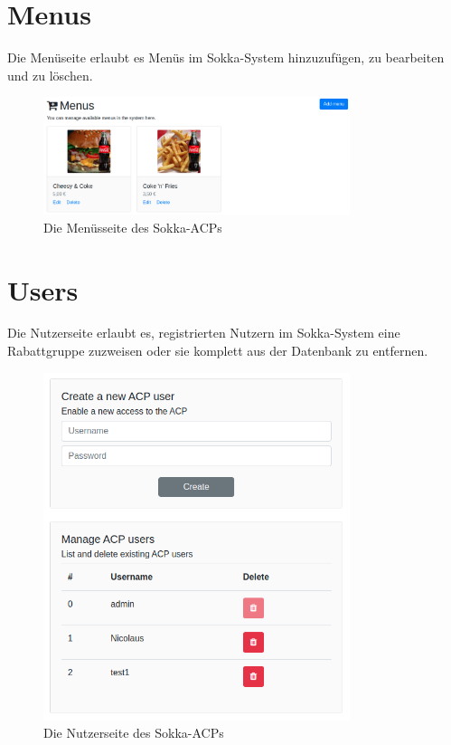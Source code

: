\section{Menus}

Die Menüseite erlaubt es Menüs im Sokka-System hinzuzufügen, zu bearbeiten und zu löschen.

\begin{figure}[ht]
    \centering
    \includegraphics[width=0.8\textwidth]{images/ACP/menus.png}
    \caption{Die Menüsseite des Sokka-ACPs}
\end{figure}

\section{Users}

Die Nutzerseite erlaubt es, registrierten Nutzern im Sokka-System eine Rabattgruppe zuzweisen oder sie komplett aus der Datenbank zu entfernen.

\begin{figure}[ht]
    \centering
    \includegraphics[width=0.8\textwidth]{images/ACP/users.png}
    \caption{Die Nutzerseite des Sokka-ACPs}
\end{figure}


